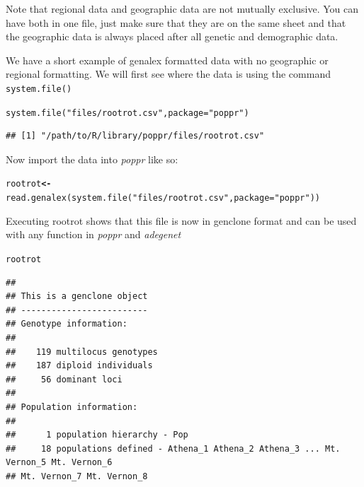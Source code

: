 \documentclass[letterpaper]{article}\usepackage[]{graphicx}\usepackage[]{color}
\makeatletter
\newcommand{\hlstr}[1]{\textcolor[rgb]{0.651,0.522,0}{#1}}%
\newcommand{\hlstd}[1]{\textcolor[rgb]{0,0,0}{#1}}%
\newcommand{\hlkwb}[1]{\textcolor[rgb]{0.502,0.502,0.753}{\textbf{#1}}}%
\newcommand{\hlkwc}[1]{\textcolor[rgb]{0,0.502,0.753}{#1}}%
\newcommand{\hlkwd}[1]{\textcolor[rgb]{0,0.267,0.4}{#1}}%
\newenvironment{kframe}{%
 \def\at@end@of@kframe{}%
 \ifinner\ifhmode%
  \def\at@end@of@kframe{\end{minipage}}%
  \begin{minipage}{\columnwidth}%
 \fi\fi%
 \def\FrameCommand##1{\hskip\@totalleftmargin \hskip-\fboxsep
 \colorbox{shadecolor}{##1}\hskip-\fboxsep
     \hskip-\linewidth \hskip-\@totalleftmargin \hskip\columnwidth}%
 \MakeFramed {\advance\hsize-\width
   \@totalleftmargin\z@ \linewidth\hsize
   \@setminipage}}%
 {\par\unskip\endMakeFramed%
 \at@end@of@kframe}
\newenvironment{knitrout}{}{} %
\makeatother
\begin{document}
Note that regional data and geographic data are not mutually exclusive. You can have both in one file, just make sure that they are on the same sheet and that the geographic data is always placed after all genetic and demographic data.

We have a short example of genalex formatted data with no geographic or regional formatting. We will first see where the data is using the command \texttt{system.file()}
\begin{knitrout}\footnotesize
{}\color{fgcolor}\begin{kframe}
\begin{alltt}
\hlkwd{system.file}\hlstd{(}\hlstr{"files/rootrot.csv"}\hlstd{,} \hlkwc{package} \hlstd{=} \hlstr{"poppr"}\hlstd{)}
\end{alltt}
\end{kframe}
\end{knitrout}

\begin{knitrout}\footnotesize
{}\color{fgcolor}\begin{kframe}
\begin{verbatim}
## [1] "/path/to/R/library/poppr/files/rootrot.csv"
\end{verbatim}
\end{kframe}
\end{knitrout}

Now import the data into \textit{poppr} like so:
\begin{knitrout}\footnotesize
{}\color{fgcolor}\begin{kframe}
\begin{alltt}
\hlstd{rootrot} \hlkwb{<-} \hlkwd{read.genalex}\hlstd{(}\hlkwd{system.file}\hlstd{(}\hlstr{"files/rootrot.csv"}\hlstd{,} \hlkwc{package} \hlstd{=} \hlstr{"poppr"}\hlstd{))}
\end{alltt}
\end{kframe}
\end{knitrout}

Executing rootrot shows that this file is now in genclone format and can be used
with any function in \textit{poppr} and \textit{adegenet}
\begin{knitrout}\footnotesize
{}\color{fgcolor}\begin{kframe}
\begin{alltt}
\hlstd{rootrot}
\end{alltt}
\begin{verbatim}
## 
## This is a genclone object
## -------------------------
## Genotype information:
## 
##    119 multilocus genotypes
##    187 diploid individuals
##     56 dominant loci
## 
## Population information:
## 
##      1 population hierarchy - Pop
##     18 populations defined - Athena_1 Athena_2 Athena_3 ... Mt. Vernon_5 Mt. Vernon_6 
## Mt. Vernon_7 Mt. Vernon_8
\end{verbatim}
\end{kframe}
\end{knitrout}
\end{document}
